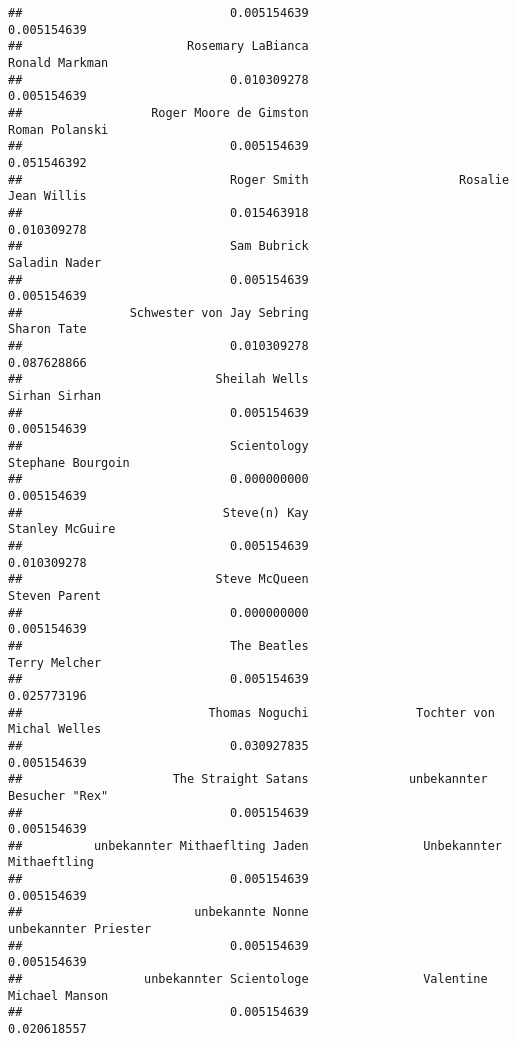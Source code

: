 \documentclass[
]{article}
\begin{document}
\begin{verbatim}
##                             0.005154639                             0.005154639 
##                       Rosemary LaBianca                          Ronald Markman 
##                             0.010309278                             0.005154639 
##                  Roger Moore de Gimston                          Roman Polanski 
##                             0.005154639                             0.051546392 
##                             Roger Smith                     Rosalie Jean Willis 
##                             0.015463918                             0.010309278 
##                             Sam Bubrick                           Saladin Nader 
##                             0.005154639                             0.005154639 
##               Schwester von Jay Sebring                             Sharon Tate 
##                             0.010309278                             0.087628866 
##                           Sheilah Wells                           Sirhan Sirhan 
##                             0.005154639                             0.005154639 
##                             Scientology                       Stephane Bourgoin 
##                             0.000000000                             0.005154639 
##                            Steve(n) Kay                         Stanley McGuire 
##                             0.005154639                             0.010309278 
##                           Steve McQueen                           Steven Parent 
##                             0.000000000                             0.005154639 
##                             The Beatles                           Terry Melcher 
##                             0.005154639                             0.025773196 
##                          Thomas Noguchi               Tochter von Michal Welles 
##                             0.030927835                             0.005154639 
##                     The Straight Satans              unbekannter Besucher "Rex" 
##                             0.005154639                             0.005154639 
##          unbekannter Mithaeflting Jaden                Unbekannter Mithaeftling 
##                             0.005154639                             0.005154639 
##                        unbekannte Nonne                    unbekannter Priester 
##                             0.005154639                             0.005154639 
##                 unbekannter Scientologe                Valentine Michael Manson 
##                             0.005154639                             0.020618557 

\end{verbatim}
\end{document}
